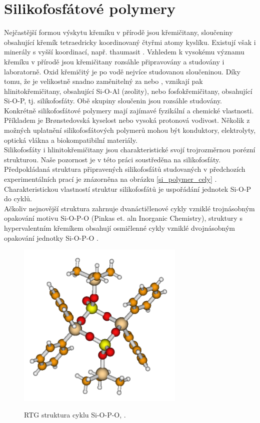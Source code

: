 \documentclass[
  digital, %
  table,   %
  lof,     %
  lot,     %
  oneside,
]{fithesis3}
\begin{document}
\section{Silikofosfátové polymery}
Nejčastější formou výskytu křemíku v přírodě jsou křemičitany, sloučeniny obsahující křemík tetraedricky koordinovaný čtyřmi atomy kyslíku. Existují však i minerály s vyšší koordinací, např. thaumasit \cite{Edge:a08100}. Vzhledem k vysokému významu křemíku v přírodě jsou křemičitany rozsáhle připravovány a studovány i laboratorně. Oxid křemičitý  je po vodě nejvíce studovanou sloučeninou. Díky tomu, že  je velikostně snadno zaměnitelný za  nebo , vznikají pak hlinitokřemičitany, obsahující Si-O-Al (zeolity), nebo fosfokřemičitany, obsahující Si-O-P, tj. silikofosfáty. Obě skupiny sloučenin jsou rozsáhle studovány. Konkrétně silikofosfátové polymery mají zajímavé fyzikální a chemické vlastnosti. Příkladem je Brønstedovská kyselost nebo vysoká protonová vodivost. Několik z možných uplatnění silikofosfátových polymerů mohou být konduktory, elektrolyty, optická vlákna a biokompatibilní materiály.\\
Silikofosfáty i hlinitokřemičitany jsou charakteristické svojí trojrozměrnou  porézní strukturou. Naše pozornost je v této práci soustředěna na silikofosfáty. Předpokládaná struktura připravených silikofosfátů studovaných v předchozích experimentálních prací je znázorněna na obrázku \ref{si_polymer_cely} \cite{Styskalik2015thesis}. Charakteristickou vlastností struktur silikofosfátů je uspořádání jednotek Si-O-P do cyklů. \\
Ačkoliv nejnovější struktura zahrnuje dvanáctičlenové cykly vzniklé trojnásobným opakování motivu Si-O-P-O (Pinkas et. aln Inorganic Chemistry), struktury s hypervalentním křemíkem obsahují osmičlenné cykly vzniklé dvojnásobným opakování jednotky Si-O-P-O .
 \begin{figure}[h!]
 \caption{RTG struktura cyklu Si-O-P-O, \cite{C4TA06823H}.}
   \center
   \includegraphics[width=8cm]{rtg_kruh_samostatne.png}
   \label{rtg_cyklus}
   \end{figure}
\end{document}

